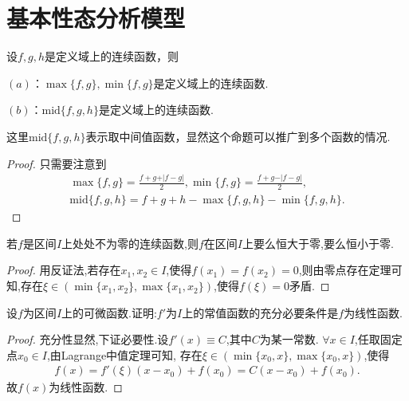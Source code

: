 \documentclass[../../main.tex]{subfiles}
\begin{document}
\section{基本性态分析模型}

\begin{proposition}[多个函数取最值或者中间值]\label{proposition:多个函数取最值或者中间值}
设\(f,g,h\)是定义域上的连续函数，则

\((a)\)：\(\max\{f,g\}, \min\{f,g\}\)是定义域上的连续函数.

\((b)\)：\(\text{mid}\{f,g,h\}\)是定义域上的连续函数.
\end{proposition}
\begin{remark}
这里\(\text{mid}\{f,g,h\}\)表示取中间值函数，显然这个命题可以推广到多个函数的情况.
\end{remark}
\begin{proof}
只需要注意到
\begin{gather*}
\max\{f,g\}=\frac{f + g+\vert f - g\vert}{2},
\min\{f,g\}=\frac{f + g-\vert f - g\vert}{2},\\
\text{mid}\{f,g,h\}=f + g + h-\max\{f,g,h\}-\min\{f,g,h\}.
\end{gather*}

\end{proof}

\begin{proposition}\label{proposition:连续函数无零点则一定恒大于零或恒小于零}
若\(f\)是区间\(I\)上处处不为零的连续函数,则\(f\)在区间\(I\)上要么恒大于零,要么恒小于零.
\end{proposition}
\begin{proof}
用反证法,若存在$x_1,x_2\in I$,使得$f(x_1)=f(x_2)=0$,则由零点存在定理可知,存在$\xi \in (\min\{x_1,x_2\},\max\{x_1,x_2\})$,使得$f(\xi)=0$矛盾.

\end{proof}

\begin{proposition}\label{proposition:导数为常数的函数必是线性函数}
设\(f\)为区间\(I\)上的可微函数.证明:\(f'\)为\(I\)上的常值函数的充分必要条件是\(f\)为线性函数.
\end{proposition}
\begin{proof}
充分性显然,下证必要性.设$f'(x)\equiv C$,其中$C$为某一常数.
$\forall x\in I$,任取固定点$x_0\in I$,由Lagrange中值定理可知,
存在$\xi\in(\min\{x_0,x\},\max\{x_0,x\})$,使得
\begin{align*}
f(x)=f'(\xi)(x-x_0)+f(x_0)=C(x-x_0)+f(x_0).
\end{align*}
故$f(x)$为线性函数.

\end{proof}
\end{document}
